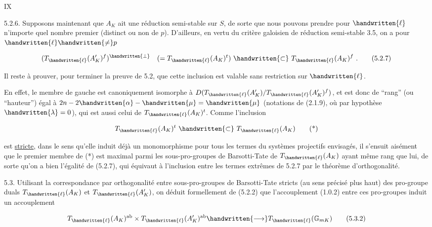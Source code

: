 \hfill IX

5.2.6. Supposons maintenant que $A_K$ ait une réduction semi-stable sur $S$, de sorte que nous pouvons prendre pour $\handwritten{\ell}$ n'importe quel nombre premier (distinct ou non de $p$). D'ailleurs, en vertu du critère galoisien de réduction semi-stable 3.5, on a pour $\handwritten{\ell}\handwritten{\ne}p$

\[
(T_{\handwritten{\ell}}(A'_K)^f)^{\handwritten{\perp}}\quad(=T_{\handwritten{\ell}}(A_K)^t)\ \handwritten{\subset}\ T_{\handwritten{\ell}}(A_K)^f\ .\tag*{(5.2.7)}
\]

Il reste à prouver, pour terminer la preuve de 5.2, que cette inclusion est valable sans restriction sur $\handwritten{\ell}$.

En effet, le membre de gauche est canoniquement isomorphe à $D(T_{\handwritten{\ell}}(A'_K)/T_{\handwritten{\ell}}(A'_K)^f)$, et est donc de ``rang'' (ou ``hauteur'') égal à $2n-2\handwritten{\alpha}-\handwritten{\mu}=\handwritten{\mu}$ (notations de (2.1.9), où par hypothèse $\handwritten{\lambda}=0$), qui est aussi celui de $T_{\handwritten{\ell}}(A_K)^t$. Comme l'inclusion

\[
T_{\handwritten{\ell}}(A_K)^t\ \handwritten{\subset}\ T_{\handwritten{\ell}}(A_K)\tag*{(*)}
\]

est \uline{stricte}, dans le sens qu'elle induit déjà un monomorphisme pour tous les termes du systèmes projectifs envisagés, il s'ensuit aisément que le premier membre de (*) est maximal parmi les sous-pro-groupes de Barsotti-Tate de $T_{\handwritten{\ell}}(A_K)$ ayant même rang que lui, de sorte qu'on a bien l'égalité de (5.2.7), qui équivaut à l'inclusion entre les termes extrêmes de 5.2.7 par le théorème d'orthogonalité.

5.3. Utilisant la correspondance par orthogonalité entre sous-pro-groupes de Barsotti-Tate stricts (au sens précisé plus haut) des pro-groupe duals $T_{\handwritten{\ell}}(A_K)$ et $T_{\handwritten{\ell}}(A'_K)$, on déduit formellement de (5.2.2) que l'accouplement (1.0.2) entre ces pro-groupes induit un accouplement

\[
T_{\handwritten{\ell}}(A_K)^{\mathrm{ab}}\times T_{\handwritten{\ell}}(A'_K)^{\mathrm{ab}}\handwritten{\longrightarrow} T_{\handwritten{\ell}}(\mathbb{G}_{mK})\tag*{(5.3.2)}
\]

